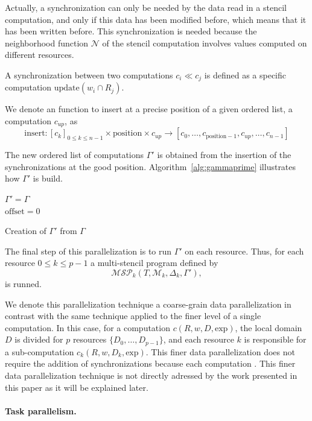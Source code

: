 Actually, a synchronization can only be needed by the data read in a stencil computation, and only if this data has been modified before, which means that it has been written before. This synchronization is needed because the neighborhood function $\mathcal{N}$ of the stencil computation involves values computed on different resources.

\begin{mydef}
A synchronization between two computations $c_i \ll c_j$ is defined as a specific computation $\text{update}(w_i \cap R_j)$.
\end{mydef}

We denote an function to insert at a precise position of a given ordered list, a computation $c_{up}$, as
\begin{equation}
\text{insert} : [c_k]_{0 \leq k \leq n-1} \times \text{position} \times c_{up} \rightarrow [c_0,\dots,c_{\text{position}-1},c_{up},\dots,c_{n-1}]
\end{equation}

The new ordered list of computations $\Gamma'$ is obtained from the insertion of the synchronizations at the good position. Algorithm~\ref{alg:gammaprime} illustrates how $\Gamma'$ is build.
\begin{center}
\begin{algorithm}
$\Gamma' = \Gamma$\\
$\text{offset} = 0$\\
\caption{Creation of $\Gamma'$ from $\Gamma$}
\label{alg:gammaprime}
\end{algorithm}
\end{center}

 The final step of this parallelization is to run $\Gamma'$ on each resource. Thus, for each resource $0 \leq k \leq p-1$ a multi-stencil program defined by
\begin{equation}
\mathcal{MSP}_k(T,\mathcal{M}_k,\Delta_k,\Gamma'),
\end{equation}
is runned.

We denote this parallelization technique a coarse-grain data parallelization in contrast with the same technique applied to the finer level of a single computation. In this case, for a computation $c(R,w,D,\text{exp})$, the local domain $D$ is divided for $p$ resources $\{D_0,\dots,D_{p-1}\}$, and each resource $k$ is responsible for a sub-computation $c_k(R,w,D_k,\text{exp})$.
This finer data parallelization does not require the addition of synchronizations because each computation . This finer data parallelization technique is not directly adressed by the work presented in this paper as it will be explained later. 

\paragraph{Task parallelism.}

